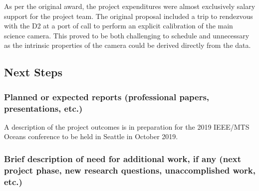 \documentclass[letterpaper,12pt]{article}
\begin{document}
\vspace{12pt}
\noindent
As per the original award, the project expenditures were almost exclusively salary support for the project team.  The original proposal included a trip to rendezvous with the D2 at a port of call to perform an explicit calibration of the main science camera.  This proved to be both challenging to schedule and unnecessary as the intrinsic properties of the camera could be derived directly from the data.

\subsection{Next Steps}
\subsubsection*{Planned or expected reports (professional papers, presentations, etc.)}

A description of the project outcomes is in preparation for the 2019 IEEE/MTS Oceans conference to be held in Seattle in October 2019.

\subsubsection*{Brief description of need for additional work, if any (next project phase, new research questions, unaccomplished work, etc.)}










\end{document}
